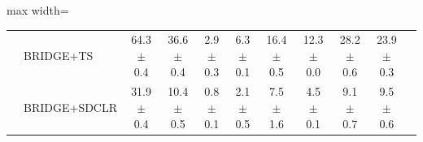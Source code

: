\begin{table}[t]
\begin{adjustbox}{max width=\textwidth}
\begin{tabular}{l l c c c c c c c c c}
 & BRIDGE+TS  & 64.3 {\scriptsize$\pm$ 0.4} & 36.6 {\scriptsize$\pm$ 0.4} & 2.9 {\scriptsize$\pm$ 0.3} & 6.3 {\scriptsize$\pm$ 0.1} & 16.4 {\scriptsize$\pm$ 0.5} & 12.3 {\scriptsize$\pm$ 0.0} & 28.2 {\scriptsize$\pm$ 0.6} & 23.9 {\scriptsize$\pm$ 0.3} \\
 & BRIDGE+SDCLR  & 31.9 {\scriptsize$\pm$ 0.4} & 10.4 {\scriptsize$\pm$ 0.5} & 0.8 {\scriptsize$\pm$ 0.1} & 2.1 {\scriptsize$\pm$ 0.5} & 7.5 {\scriptsize$\pm$ 1.6} & 4.5 {\scriptsize$\pm$ 0.1} & 9.1 {\scriptsize$\pm$ 0.7} & 9.5 {\scriptsize$\pm$ 0.6} \\
\bottomrule
\end{tabular}
\end{adjustbox}
\end{table}
